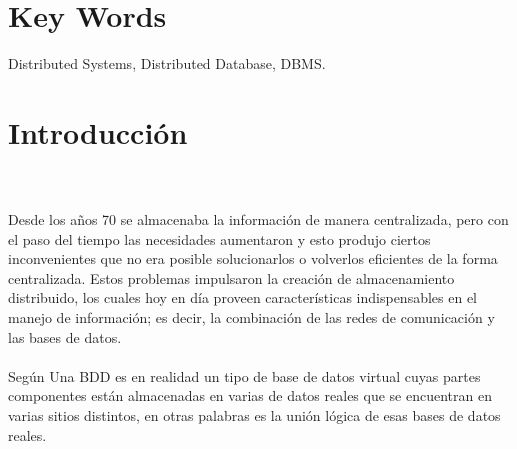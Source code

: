 \documentclass[10pt,a4paper,oneside]{article}
\begin{document}
\section*{Key Words}
Distributed Systems, Distributed Database, DBMS.


\section{Introducci\'on}
\\\\Desde los a\~nos 70 se almacenaba la informaci\'on de manera centralizada, pero con el paso del tiempo las necesidades aumentaron y esto produjo ciertos inconvenientes que no era posible solucionarlos o volverlos eficientes de la forma centralizada. Estos problemas impulsaron la creaci\'on de almacenamiento distribuido, los cuales hoy en d\'ia proveen caracter\'isticas indispensables en el manejo de informaci\'on; es decir, la combinaci\'on de las redes de comunicaci\'on y las bases de datos.
\\\\Seg\'un \cite{Hernandez} Una BDD es en realidad un tipo de base de datos virtual cuyas partes componentes est\'an almacenadas en varias de datos reales que se encuentran en varias sitios distintos, en otras palabras es la uni\'on l\'ogica de esas bases de datos reales.
\end{document}
